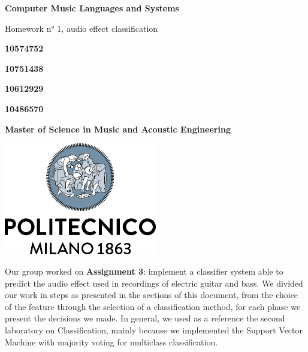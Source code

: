 \documentclass[a4paper,12pt]{report}
\begin{document}
\begin{titlepage}
\begin{center}
    \vspace*{1cm}
    
    \Huge
    \textbf{Computer Music Languages and Systems}
    
    \vspace{0.5cm}
    \LARGE
    Homework n° 1, audio effect classification

    \vspace{1 cm}
    
    \textbf{10574752}
    
    \vspace{0.5cm}
    
    \textbf{10751438}
     
    \vspace{0.5cm}
    
    \textbf{10612929}
     
    
    \vspace{0.5cm}
    
    \textbf{10486570}
    
    \vspace{0.5cm}
    
    \vfill
    
   
    \date{April 2021}
    \vspace{0.3cm}
    \textbf{Master of Science in Music and Acoustic Engineering}
    
    \vspace{0.8cm}
    
    \includegraphics[width=0.5\textwidth]{logo_positivo.png}
    
\end{center}
\end{titlepage}


\abstract{}
Our group worked on \textbf{Assignment 3}: implement a 			  	classifier system able to predict the audio effect used in 			 	recordings of electric guitar and bass. We divided our work in 		 	steps as presented in the sections of this document, from the  	      	choice of the feature through the selection of a classification 		method, for each phase we present the decisions we made. In 			general, we used as a reference the second laboratory on 				Classification, mainly because we implemented the Support Vector 	Machine with majority voting for multiclass classification.
\end{document}
